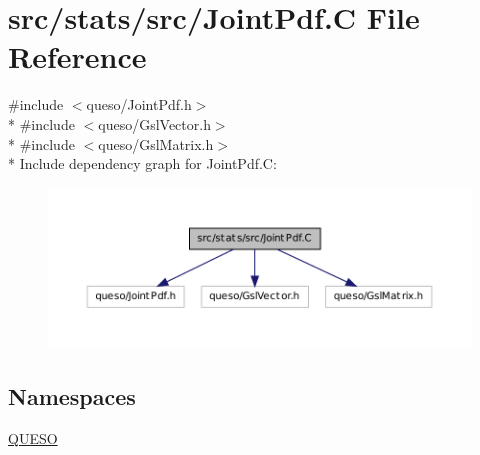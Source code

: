 \hypertarget{_joint_pdf_8_c}{\section{src/stats/src/\-Joint\-Pdf.C File Reference}
\label{_joint_pdf_8_c}
}
{\ttfamily \#include $<$queso/\-Joint\-Pdf.\-h$>$}\\*
{\ttfamily \#include $<$queso/\-Gsl\-Vector.\-h$>$}\\*
{\ttfamily \#include $<$queso/\-Gsl\-Matrix.\-h$>$}\\*
Include dependency graph for Joint\-Pdf.\-C\-:
\nopagebreak
\begin{figure}[H]
\begin{center}
\leavevmode
\includegraphics[width=350pt]{_joint_pdf_8_c__incl}
\end{center}
\end{figure}
\subsection*{Namespaces}
\begin{DoxyCompactItemize}
\item 
\hyperlink{namespace_q_u_e_s_o}{Q\-U\-E\-S\-O}
\end{DoxyCompactItemize}

